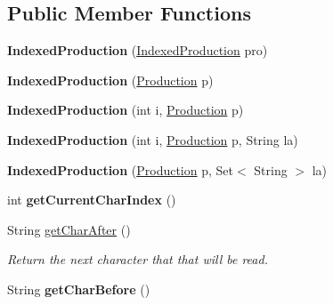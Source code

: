 \subsection*{Public Member Functions}
\begin{DoxyCompactItemize}
\item 
\hypertarget{classcontext_free_1_1parser_1_1_indexed_production_a7c67c63baac69c30e9887c0234fd35d9}{{\bfseries Indexed\-Production} (\hyperlink{classcontext_free_1_1parser_1_1_indexed_production}{Indexed\-Production} pro)}\label{classcontext_free_1_1parser_1_1_indexed_production_a7c67c63baac69c30e9887c0234fd35d9}

\item 
\hypertarget{classcontext_free_1_1parser_1_1_indexed_production_a33ac7cade5d7f2a750e07f3b7f7983ac}{{\bfseries Indexed\-Production} (\hyperlink{classcontext_free_1_1grammar_1_1_production}{Production} p)}\label{classcontext_free_1_1parser_1_1_indexed_production_a33ac7cade5d7f2a750e07f3b7f7983ac}

\item 
\hypertarget{classcontext_free_1_1parser_1_1_indexed_production_ac1615174ca96db64a5adfdabd768f9d5}{{\bfseries Indexed\-Production} (int i, \hyperlink{classcontext_free_1_1grammar_1_1_production}{Production} p)}\label{classcontext_free_1_1parser_1_1_indexed_production_ac1615174ca96db64a5adfdabd768f9d5}

\item 
\hypertarget{classcontext_free_1_1parser_1_1_indexed_production_aa1754311192ad2f5c0332025dd162e5f}{{\bfseries Indexed\-Production} (int i, \hyperlink{classcontext_free_1_1grammar_1_1_production}{Production} p, String la)}\label{classcontext_free_1_1parser_1_1_indexed_production_aa1754311192ad2f5c0332025dd162e5f}

\item 
\hypertarget{classcontext_free_1_1parser_1_1_indexed_production_af2e1718023e522ef94aac862ab72307b}{{\bfseries Indexed\-Production} (\hyperlink{classcontext_free_1_1grammar_1_1_production}{Production} p, Set$<$ String $>$ la)}\label{classcontext_free_1_1parser_1_1_indexed_production_af2e1718023e522ef94aac862ab72307b}

\item 
\hypertarget{classcontext_free_1_1parser_1_1_indexed_production_aef48dbe23561cee5a0b744978d1ac2c7}{int {\bfseries get\-Current\-Char\-Index} ()}\label{classcontext_free_1_1parser_1_1_indexed_production_aef48dbe23561cee5a0b744978d1ac2c7}

\item 
String \hyperlink{classcontext_free_1_1parser_1_1_indexed_production_a498db47a05e7f10e580d689e925193b4}{get\-Char\-After} ()
\begin{DoxyCompactList}\small\item\em Return the next character that that will be read. \end{DoxyCompactList}\item 
\hypertarget{classcontext_free_1_1parser_1_1_indexed_production_a143a99e7bf0e81789ee79f514aa3d575}{String {\bfseries get\-Char\-Before} ()}\label{classcontext_free_1_1parser_1_1_indexed_production_a143a99e7bf0e81789ee79f514aa3d575}


\end{DoxyCompactItemize}
